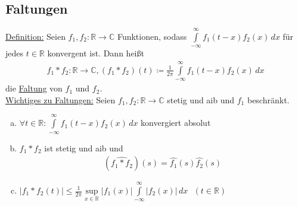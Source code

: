 \subsection{Faltungen}
\underline{Definition:} Seien $f_1,f_2: \mathbb{R} \to \mathbb{C}$ Funktionen, sodass $\int \limits_{-\infty}^\infty f_1(t-x)f_2(x)\,dx$ für jedes $t \in \mathbb{R}$ konvergent ist. Dann heißt
\begin{align*}
    f_1 * f_2: \mathbb{R} \to \mathbb{C}, (f_1*f_2)(t) \coloneqq \frac{1}{2\pi} \int \limits_{-\infty}^\infty f_1(t-x)f_2(x)\,dx
\end{align*}
die \underline{Faltung} von $f_1$ und $f_2$. \\
\underline{Wichtiges zu Faltungen:} Seien $f_1,f_2: \mathbb{R} \to \mathbb{C}$ stetig und aib und $f_1$ beschränkt.
\begin{enumerate} [a)]
    \item $\forall t \in \mathbb{R}: \int \limits_{-\infty}^\infty f_1(t-x)f_2(x)\,dx$ konvergiert absolut
    \item $f_1*f_2$ ist stetig und aib und
    \begin{align*}
        (\widehat{f_1*f_2})(s) = \widehat{f_1}(s) \widehat{f_2}(s)
    \end{align*}
    \item $\lvert f_1*f_2(t)\rvert \leq \frac{1}{2\pi} \sup \limits_{x \in \mathbb{R}} \lvert f_1(x)\rvert \int \limits_{-\infty}^\infty \lvert f_2(x)\rvert\,dx \text{ } (t \in \mathbb{R})$
\end{enumerate}

